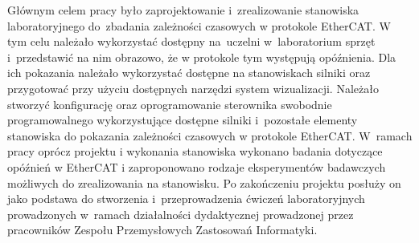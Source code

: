 Głównym celem pracy było zaprojektowanie i~zrealizowanie stanowiska laboratoryjnego do~zbadania zależności czasowych w protokole EtherCAT. W tym celu należało wykorzystać dostępny na~uczelni w~laboratorium sprzęt i~przedstawić na nim obrazowo, że w protokole tym występują opóźnienia. Dla ich pokazania należało wykorzystać dostępne na stanowiskach silniki oraz przygotować przy użyciu dostępnych narzędzi system wizualizacji.
Należało stworzyć konfigurację oraz oprogramowanie sterownika swobodnie programowalnego wykorzystujące dostępne silniki i~pozostałe elementy stanowiska do pokazania zależności czasowych w protokole EtherCAT.
W~ramach pracy oprócz projektu i wykonania stanowiska wykonano badania dotyczące opóźnień w EtherCAT i zaproponowano rodzaje eksperymentów badawczych możliwych do zrealizowania na stanowisku.
Po zakończeniu projektu posłuży on jako podstawa do stworzenia i~przeprowadzenia ćwiczeń laboratoryjnych prowadzonych w~ramach działalności dydaktycznej prowadzonej przez pracowników Zespołu Przemysłowych Zastosowań Informatyki.
%
%


